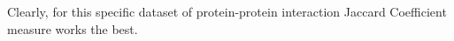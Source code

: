 \documentclass[journal]{IEEEtran}
\begin{document}
Clearly, for this specific dataset of protein-protein interaction Jaccard Coefficient measure works the best.


%
%



%
%
\end{document}
